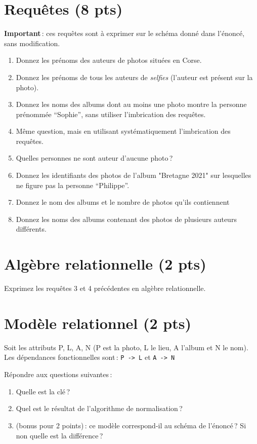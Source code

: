 \section{Requêtes (8 pts)}

\textbf{Important}\,: ces requêtes sont à exprimer
sur le schéma donné dans l'énoncé, sans modification.

\begin{enumerate}
  \item Donnez les prénoms des auteurs de photos situées en Corse.
    
  \item Donnez les prénoms de tous  les auteurs de \emph{selfies} (l'auteur est présent sur la photo).
  
  
  \item Donnez les noms des albums dont au moins une photo montre la personne prénommée ``Sophie'',
     sans utiliser l'imbrication des requêtes.
  \item Même question, mais  en utilisant systématiquement l'imbrication des requêtes.
  
  \item Quelles personnes ne sont auteur d'aucune photo\,?
  \item Donnez les identifiants des photos de l'album "Bretagne 2021" sur lesquelles ne figure
     pas la personne ``Philippe''.

  \item Donnez le nom des albums et le nombre de photos qu'ils contiennent
  
\item Donnez les noms des albums contenant des photos de plusieurs auteurs différents.
  \end{enumerate}

\section{Algèbre relationnelle ({\bf 2 pts})}

Exprimez les requêtes 3 et 4 précédentes
en algèbre relationnelle.

\section{Modèle relationnel ({\bf 2 pts})}

Soit les attributs P, L, A, N  (P est la photo, L le lieu,
A l'album et N le nom). Les dépendances fonctionnelles sont\,:
\texttt{P -> L} et \texttt{A -> N}

Répondre aux questions suivantes\,: 
\begin{enumerate}
  \item Quelle est la clé\,?
  \item Quel est le résultat de l'algorithme de normalisation\,?
  \item (bonus pour 2 points)\,: ce modèle correspond-il 
     au schéma de l'énoncé\,? Si non quelle est la différence\,?
\end{enumerate}